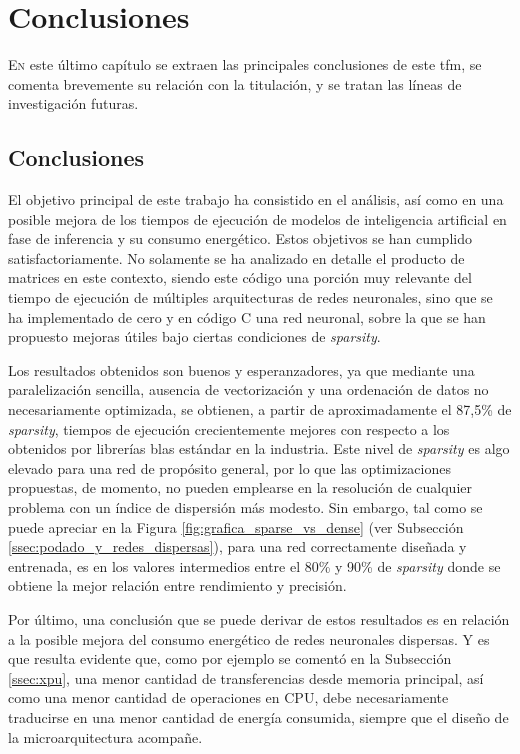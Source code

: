 \chapter{Conclusiones}
\label{chap:conclusiones}

\lettrine{E}{n} este último capítulo se extraen las principales conclusiones de este \acrlong{tfm}, se comenta brevemente su relación con la titulación, y se tratan las líneas de investigación futuras.

\section{Conclusiones}
El objetivo principal de este trabajo ha consistido en el análisis, así como en una posible mejora de los tiempos de ejecución de modelos de inteligencia artificial en fase de inferencia y su consumo energético. Estos objetivos se han cumplido satisfactoriamente. No solamente se ha analizado en detalle el producto de matrices en este contexto, siendo este código una porción muy relevante del tiempo de ejecución de múltiples arquitecturas de redes neuronales, sino que se ha implementado de cero y en código C una red neuronal, sobre la que se han propuesto mejoras útiles bajo ciertas condiciones de \textit{sparsity}.

Los resultados obtenidos son buenos y esperanzadores, ya que mediante una paralelización sencilla, ausencia de vectorización y una ordenación de datos no necesariamente optimizada, se obtienen, a partir de aproximadamente el 87,5\% de \textit{sparsity}, tiempos de ejecución crecientemente mejores con respecto a los obtenidos por librerías \acrshort{blas} estándar en la industria. Este nivel de \textit{sparsity} es algo elevado para una red de propósito general, por lo que las optimizaciones propuestas, de momento, no pueden emplearse en la resolución de cualquier problema con un índice de dispersión más modesto. Sin embargo, tal como se puede apreciar en la Figura \ref{fig:grafica_sparse_vs_dense} (ver Subsección \ref{ssec:podado_y_redes_dispersas}), para una red correctamente diseñada y entrenada, es en los valores intermedios entre el 80\% y 90\% de \textit{sparsity} donde se obtiene la mejor relación entre rendimiento y precisión.

Por último, una conclusión que se puede derivar de estos resultados es en relación a la posible mejora del consumo energético de redes neuronales dispersas. Y es que resulta evidente que, como por ejemplo se comentó en la Subsección \ref{ssec:xpu}, una menor cantidad de transferencias desde memoria principal, así como una menor cantidad de operaciones en CPU, debe necesariamente traducirse en una menor cantidad de energía consumida, siempre que el diseño de la microarquitectura acompañe.

